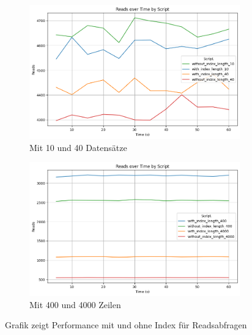 \vspace{-8pt}
\begin{figure}[H]
    \centering
    \begin{subfigure}[t]{0.48\textwidth}
        \centering
        \includegraphics[width=\textwidth]{PNGs/Script/Index/B_Tree/low-count/Reads}
        \caption{Mit 10 und 40 Datensätze}
        \label{indexing-b-tree-low-reads}
    \end{subfigure}
    \hfill
    \begin{subfigure}[t]{0.48\textwidth}
        \centering
        \includegraphics[width=\textwidth]{PNGs/Script/Index/B_Tree/high-count/Reads}
        \caption{Mit 400 und 4000 Zeilen}
        \label{indexing-b-tree-high-reads}
    \end{subfigure}
    \vspace{-6pt}
    \caption[B-Tree-Indexing: Mit Index vs Ohne]{Grafik zeigt Performance mit und ohne Index für Readsabfragen}
    \label{fig:indexing-vs-no}
\end{figure}
\vspace{-15pt}

